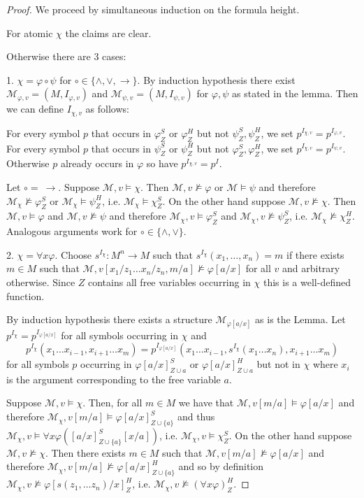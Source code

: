 \documentclass[a4paper,11pt]{report}
\theoremstyle{definition}
\theoremstyle{definition}
\theoremstyle{definition}
\theoremstyle{definition}
\theoremstyle{definition}
\theoremstyle{definition}
\theoremstyle{definition}
\begin{document}
	\begin{proof}
		We proceed by simultaneous induction on the formula height.
		
		For atomic $\chi$ the claims are clear.
		
		Otherwise there are $3$ cases:
		
		1. $\chi = \varphi\circ\psi$ for $\circ\in\{\wedge,\vee,\to\}$. By induction hypothesis there exist $\mathcal M_{\varphi, v} = (M, I_{\varphi, v})$ and $\mathcal M_{\psi, v} = (M, I_{\psi, v})$ for $\varphi,\psi$ as stated in the lemma.
		Then we can define $I_{\chi, v}$ as follows:
		
		For every symbol $p$ that occurs in $\varphi^S_Z$ or $\varphi^H_Z$ but not $\psi^S_Z, \psi^H_Z$, we set $p^{I_{\chi, v}} = p^{I_{\varphi, v}}$. For every symbol $p$ that occurs in $\psi^S_Z$ or $\psi^H_Z$ but not $\varphi^S_Z, \varphi^H_Z$, we set $p^{I_{\chi, v}} = p^{I_{\psi, v}}$. Otherwise $p$ already occurs in $\varphi$ so have $p^{I_{\chi, v}} = p^I$.
		
		Let $\circ=\ \to$. Suppose $\mathcal M, v\models\chi$. Then $\mathcal M, v\not\models\varphi$ or $\mathcal M\models\psi$ and therefore $\mathcal M_\chi\not\models\varphi^S_Z$ or $\mathcal M_\chi\models\psi^H_Z$, i.e. $\mathcal M_\chi\models\chi^S_Z$. On the other hand suppose $\mathcal M, v\not\models\chi$. Then $\mathcal M, v\models\varphi$ and $\mathcal M, v\not\models\psi$ and therefore $\mathcal M_\chi, v\models \varphi^S_Z$ and $\mathcal M_\chi, v\not\models\psi^S_Z$, i.e. $\mathcal M_\chi\not\models\chi^H_Z$. Analogous arguments work for $\circ\in\{\wedge, \vee\}$.
		
		2. $\chi = \forall x\varphi$. Choose $s^{I_\chi}:M^n\to M$ such that $s^{I_\chi}(x_1,\dots, x_n) = m$ if there exists $m\in M$ such that $\mathcal M, v[x_1/z_1\dots x_n/z_n, m/a]\not\models\varphi[a/x]$ for all $v$ and arbitrary otherwise. Since $Z$ contains all free variables occurring in $\chi$ this is a well-defined function.
		
		By induction hypothesis there exists a structure $\mathcal M_{\varphi[a/x]}$ as is the Lemma. Let $p^{I_\chi} = p^{I_{\varphi[a/x]}}$ for all symbols occurring in $\chi$ and $$p^{I_\chi}(x_1\dots x_{i-1}, x_{i+1}\dots x_m) = p^{I_{\varphi[a/x]}}(x_1\dots x_{i-1}, s^{I_\chi}(x_1\dots x_n), x_{i+1}\dots x_m)$$ for all symbols $p$ occurring in $\varphi[a/x]^S_{Z\cup a}$ or $\varphi[a/x]^H_{Z\cup a}$ but not in $\chi$ where $x_i$ is the argument corresponding to the free variable $a$.
		
		Suppose $\mathcal M, v\models\chi$. Then, for all $m\in M$ we have that $\mathcal M, v[m/a]\models\varphi[a/x]$ and therefore $\mathcal M_{\chi}, v[m/a]\models\varphi[a/x]^S_{Z\cup\{a\}}$ and thus $\mathcal M_{\chi}, v\models \forall x\varphi([a/x]^S_{Z\cup\{a\}}[x/a])$, i.e. $\mathcal M_\chi,v\models \chi^S_Z$. On the other hand suppose $\mathcal M, v\not\models\chi$. Then there exists $m\in M$ such that $\mathcal M, v[m/a]\not\models\varphi[a/x]$ and therefore $\mathcal M_\chi, v[m/a]\not\models\varphi[a/x]^H_{Z\cup\{a\}}$ and so by definition $\mathcal M_\chi, v\not\models\varphi[s(z_1,\dots z_n)/x]^H_Z$, i.e. $\mathcal M_\chi, v\not\models(\forall x\varphi)^H_Z$.
		

\end{proof}
\end{document}
